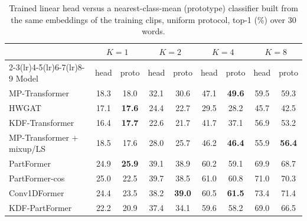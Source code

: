 \begin{table}[t]
\centering
\small
\caption{Trained linear head versus a nearest-class-mean (prototype) classifier built from the same embeddings of the training clips, uniform protocol, top-1 (\%) over 30 words.}
\label{tab:proto}
\begin{tabular}{lcccccccc}
\toprule
 & \multicolumn{2}{c}{$K=1$} & \multicolumn{2}{c}{$K=2$} & \multicolumn{2}{c}{$K=4$} & \multicolumn{2}{c}{$K=8$} \\
\cmidrule(lr){2-3}\cmidrule(lr){4-5}\cmidrule(lr){6-7}\cmidrule(lr){8-9}
Model & head & proto & head & proto & head & proto & head & proto \\
\midrule
MP-Transformer & 18.3 & 18.0 & 32.1 & 30.6 & 47.1 & \textbf{49.6} & 59.5 & 59.3 \\
HWGAT & 17.1 & \textbf{17.6} & 24.4 & 22.7 & 29.5 & 28.2 & 45.7 & 42.5 \\
KDF-Transformer & 16.4 & \textbf{17.7} & 22.6 & 21.7 & 41.7 & 37.1 & 56.9 & 53.2 \\
MP-Transformer + mixup/LS & 18.5 & 17.6 & 28.0 & 25.7 & 46.2 & \textbf{46.4} & 55.9 & \textbf{56.4} \\
PartFormer & 24.9 & \textbf{25.9} & 39.1 & 38.9 & 60.2 & 59.1 & 69.9 & 68.7 \\
PartFormer-cos & 25.0 & 22.5 & 39.7 & 38.5 & 61.0 & 60.8 & 71.0 & 70.3 \\
Conv1DFormer & 24.4 & 23.5 & 38.2 & \textbf{39.0} & 60.5 & \textbf{61.5} & 73.4 & 71.4 \\
KDF-PartFormer & 22.2 & 20.9 & 37.4 & 34.1 & 59.6 & 58.2 & 69.0 & 66.5 \\
\bottomrule
\end{tabular}
\end{table}
